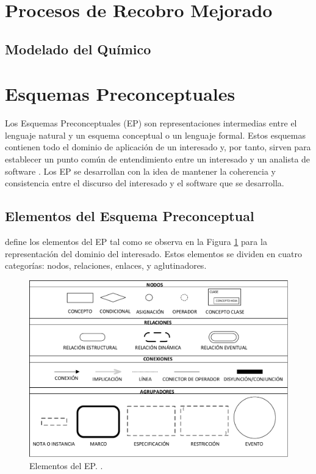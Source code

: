 \section{Procesos de Recobro Mejorado}\label{sec:EOR}

\subsection{Modelado del Químico}\label{subsec:Chemical}


\section{Esquemas Preconceptuales}\label{sec:EP}

Los Esquemas Preconceptuales (EP) son representaciones intermedias entre el lenguaje natural y un esquema conceptual o un lenguaje formal. Estos esquemas contienen todo el dominio de aplicación de un interesado y, por tanto, sirven para establecer un punto común de entendimiento entre un interesado y un analista de software \citep{zapata2007phd}. Los EP se desarrollan con la idea de mantener la coherencia y consistencia entre el discurso del interesado y el software que se desarrolla. 

\subsection{Elementos del Esquema Preconceptual}\label{subsec:ElementsEP}
\cite{zapata2012unc} define los elementos del EP tal como se observa en la Figura \ref{fig:InitialPS} para la representación del dominio del interesado. Estos elementos se dividen en cuatro categorías: nodos, relaciones, enlaces, y aglutinadores.\\

\begin{figure}[h]
	\centering%
	\includegraphics[scale=0.51]{Fig/ElementosDelEP.pdf}%
	\caption[Elementos del EP.]{Elementos del EP. \citep{zapata2012unc}.} \label{fig:InitialPS}
\end{figure}

